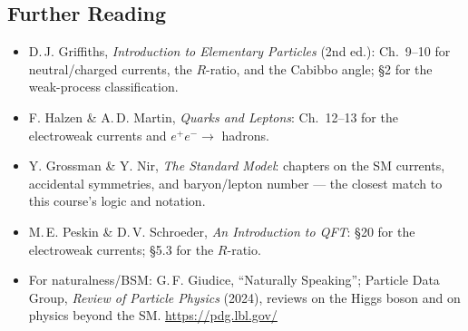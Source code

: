\begin{furtherreading}
\subsection*{Further Reading}

\begin{itemize}
  \item D.\,J. Griffiths, \textit{Introduction to Elementary Particles}
        (2nd ed.): Ch.~9--10 for neutral/charged currents, the $R$-ratio,
        and the Cabibbo angle; \S2 for the weak-process classification.
  \item F. Halzen \& A.\,D. Martin, \textit{Quarks and Leptons}: Ch.~12--13
        for the electroweak currents and $e^+e^-\to$ hadrons.
  \item Y. Grossman \& Y. Nir, \textit{The Standard Model}: chapters on
        the SM currents, accidental symmetries, and baryon/lepton number
        --- the closest match to this course's logic and notation.
  \item M.\,E. Peskin \& D.\,V. Schroeder, \textit{An Introduction to QFT}:
        \S20 for the electroweak currents; \S5.3 for the $R$-ratio.
  \item For naturalness/BSM: G.\,F. Giudice, ``Naturally Speaking'';
        Particle Data Group, \textit{Review of Particle Physics} (2024),
        reviews on the Higgs boson and on physics beyond the SM.
        \url{https://pdg.lbl.gov/}
\end{itemize}
\end{furtherreading}

